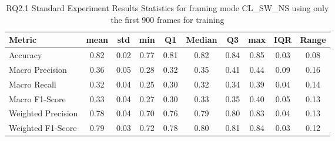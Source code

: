 \begin{table}[h]
\caption{RQ2.1 Standard Experiment Results Statistics for framing mode CL\_SW\_NS using only the first 900 frames for training}
\label{tab:rq2.1_900_Standard_Results_Statistics}
\begin{tabular}{|l|c|c|c|c|c|c|c|c|c|}
\toprule
Metric & mean & std & min & Q1 & Median & Q3 & max & IQR & Range \\
\midrule
Accuracy & 0.82 & 0.02 & 0.77 & 0.81 & 0.82 & 0.84 & 0.85 & 0.03 & 0.08 \\
Macro Precision & 0.36 & 0.05 & 0.28 & 0.32 & 0.35 & 0.41 & 0.44 & 0.09 & 0.16 \\
Macro Recall & 0.32 & 0.04 & 0.25 & 0.30 & 0.32 & 0.34 & 0.39 & 0.04 & 0.14 \\
Macro F1-Score & 0.33 & 0.04 & 0.27 & 0.30 & 0.33 & 0.35 & 0.40 & 0.05 & 0.13 \\
Weighted Precision & 0.78 & 0.04 & 0.70 & 0.76 & 0.79 & 0.80 & 0.83 & 0.04 & 0.13 \\
Weighted F1-Score & 0.79 & 0.03 & 0.72 & 0.78 & 0.80 & 0.81 & 0.84 & 0.03 & 0.12 \\
\bottomrule
\end{tabular}
\end{table}